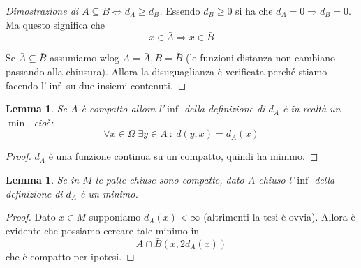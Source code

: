 \documentclass[a4paper,10pt]{article}
\newcounter{counter1}
\theoremstyle{plain}
\newtheorem{mylem}[counter1]{Lemma}
\theoremstyle{definition}
\theoremstyle{remark}
\newcommand{\pa}[1]{\left(#1\right)}
\begin{document}
\begin{proof}[Dimostrazione di $\bar A \subseteq \bar B
  \Leftrightarrow d_A \ge d_B$]
  Essendo $d_B \ge 0$ si ha che $d_A = 0 \Rightarrow d_B = 0$. Ma
  questo significa che 
  \[ x \in \bar A \Rightarrow x \in \bar B \]

  Se $\bar A \subseteq \bar B$ assumiamo wlog $A = \bar A, B = \bar B$
  (le funzioni distanza non cambiano passando alla chiusura). Allora
  la disuguaglianza è verificata perché stiamo facendo l'$\inf$ su due
  insiemi contenuti.  
\end{proof}


\begin{mylem}
\label{lem:infmincompatto}
  Se $A$ è compatto allora l'$\inf$ della definizione di $d_A$ è in
  realtà un $\min$, cioè:
  \[ \forall x \in \Omega \; \exists y \in A \ :\ d(y,x) = d_A(x) \]
\end{mylem}
\begin{proof}
  $d_A$ è una funzione continua su un compatto, quindi ha minimo.
\end{proof}

\begin{mylem}\label{lem:pallechiusecompattemin}
  Se in $M$ le palle chiuse sono compatte, dato $A$ chiuso l'$\inf$
  della definizione di $d_A$ è un minimo.
\end{mylem}
\begin{proof}
  Dato $x\in M$ supponiamo $d_A(x) < \infty$ (altrimenti la tesi è
  ovvia). Allora è evidente che possiamo cercare tale minimo in 
  \[ A \cap \bar B\pa{x,2 d_A(x)} \]
  che è compatto per ipotesi.
\end{proof}
\end{document}
